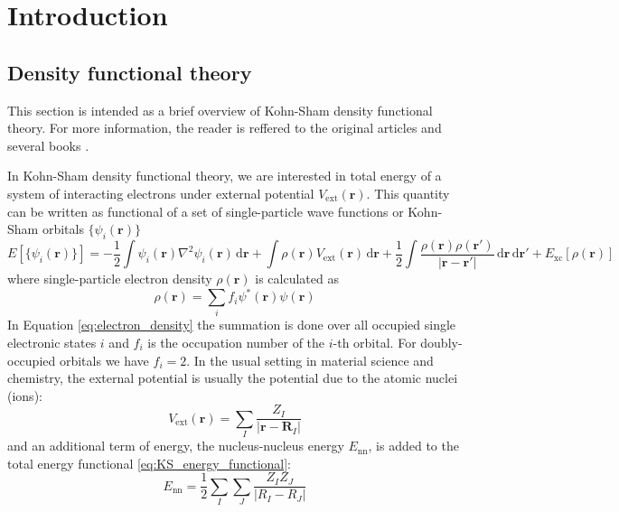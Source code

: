 \chapter{Introduction}

\section{Density functional theory}

This section is intended as a brief overview of Kohn-Sham density functional theory.
For more information, the reader is reffered to the original articles
\cite{Hohenberg1964,Kohn1965} and several books
\cite{Martin2004,Kohanoff2006,Marx2009,Giustino2014}.

In Kohn-Sham density functional theory, we are interested in total energy of a system of
interacting electrons
under external potential $V_{\mathrm{ext}}(\mathbf{r})$. This quantity can be written
as functional of
a set of single-particle wave functions or Kohn-Sham orbitals $\{\psi_{i}(\mathbf{r})\}$
\begin{equation}
E\left[\{\psi_{i}(\mathbf{r})\}\right] =
-\frac{1}{2} \int \psi_{i}(\mathbf{r}) \nabla^{2} \psi_{i}(\mathbf{r})\,\mathrm{d}\mathbf{r} +
\int \rho(\mathbf{r}) V_{\mathrm{ext}}(\mathbf{r})\,\mathrm{d}\mathbf{r} +
\frac{1}{2}\int
\frac{\rho(\mathbf{r}) \rho(\mathbf{r}')}{\left|\mathbf{r}-\mathbf{r}'\right|}\,
\mathrm{d}\mathbf{r}\,\mathrm{d}\mathbf{r}' + E_{\mathrm{xc}}\left[\rho(\mathbf{r})\right]
\label{eq:KS_energy_functional}
\end{equation}
%
where single-particle electron density $\rho(\mathbf{r})$ is calculated as
%
\begin{equation}
\rho(\mathbf{r}) = \sum_{i} f_{i} \psi^{*}(\mathbf{r}) \psi(\mathbf{r})
\label{eq:electron_density}
\end{equation}
%
In Equation \ref{eq:electron_density} the summation is done over
all occupied single electronic states $i$ and $f_{i}$
is the occupation number of the $i$-th orbital. For doubly-occupied orbitals
we have $f_{i}=2$.
In the usual setting in material science and chemistry, the external potential
is usually the potential due to the atomic nuclei (ions):
\begin{equation}
V_{\mathrm{ext}}(\mathbf{r}) = \sum_{I} \frac{Z_{I}}{\left|\mathbf{r} - \mathbf{R}_{I}\right|}
\end{equation}
and an additional term of energy, the nucleus-nucleus energy $E_{\mathrm{nn}}$,
is added to the total energy functional \eqref{eq:KS_energy_functional}:
\begin{equation}
E_{\mathrm{nn}} = \frac{1}{2} \sum_{I}\sum_{J}\frac{Z_{I} Z_{J}}{\left| R_{I} - R_{J} \right|}
\end{equation}

